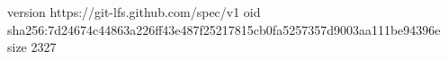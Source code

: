 version https://git-lfs.github.com/spec/v1
oid sha256:7d24674c44863a226ff43e487f25217815cb0fa5257357d9003aa111be94396e
size 2327
